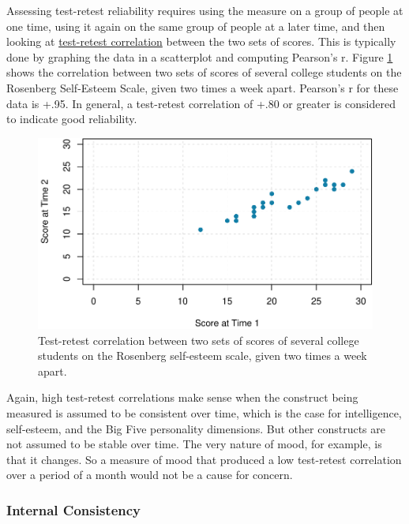 \documentclass[
]{krantz}
\begin{document}
Assessing test-retest reliability requires using the measure on a group of people at one time, using it again on the same group of people at a later time, and then looking at \protect\hyperlink{test-retest-correlation}{test-retest correlation} between the two sets of scores. This is typically done by graphing the data in a scatterplot and computing Pearson's r. Figure \ref{fig:retest} shows the correlation between two sets of scores of several college students on the Rosenberg Self-Esteem Scale, given two times a week apart. Pearson's r for these data is +.95. In general, a test-retest correlation of +.80 or greater is considered to indicate good reliability.

\begin{figure}

{\centering \includegraphics[width=0.8\linewidth]{06-measurement_files/figure-latex/retest-1} 

}

\caption{Test-retest correlation between two sets of scores of several college students on the Rosenberg self-esteem scale, given two times a week apart.}\label{fig:retest}
\end{figure}

Again, high test-retest correlations make sense when the construct being measured is assumed to be consistent over time, which is the case for intelligence, self-esteem, and the Big Five personality dimensions. But other constructs are not assumed to be stable over time. The very nature of mood, for example, is that it changes. So a measure of mood that produced a low test-retest correlation over a period of a month would not be a cause for concern.

\hypertarget{internal-consistency}{%
\subsubsection*{Internal Consistency}\label{internal-consistency}}
\end{document}
